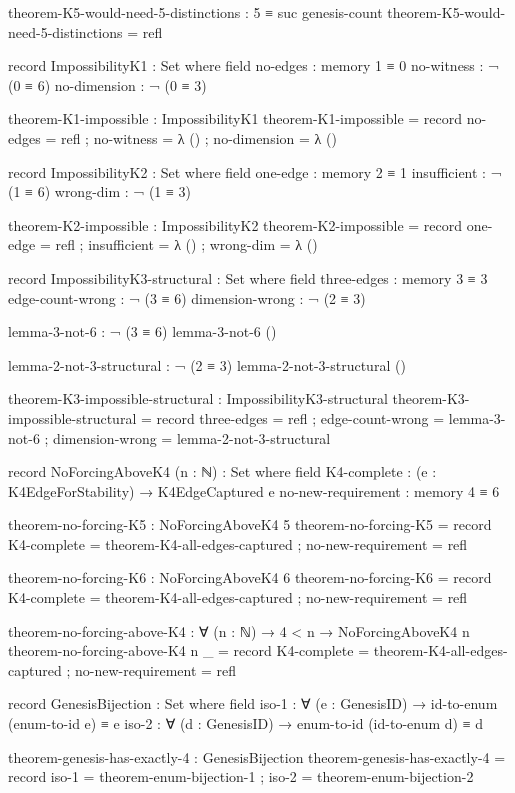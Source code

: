 \documentclass[11pt,a4paper]{book}
\begin{document}
\begin{code}
theorem-K5-would-need-5-distinctions : 5 ≡ suc genesis-count
theorem-K5-would-need-5-distinctions = refl

record ImpossibilityK1 : Set where
  field
    no-edges      : memory 1 ≡ 0
    no-witness    : ¬ (0 ≡ 6)
    no-dimension  : ¬ (0 ≡ 3)

theorem-K1-impossible : ImpossibilityK1
theorem-K1-impossible = record
  { no-edges     = refl
  ; no-witness   = λ ()
  ; no-dimension = λ ()
  }

record ImpossibilityK2 : Set where
  field
    one-edge      : memory 2 ≡ 1
    insufficient  : ¬ (1 ≡ 6)
    wrong-dim     : ¬ (1 ≡ 3)

theorem-K2-impossible : ImpossibilityK2
theorem-K2-impossible = record
  { one-edge     = refl
  ; insufficient = λ ()
  ; wrong-dim    = λ ()
  }

record ImpossibilityK3-structural : Set where
  field
    three-edges     : memory 3 ≡ 3
    edge-count-wrong : ¬ (3 ≡ 6)
    dimension-wrong  : ¬ (2 ≡ 3)

lemma-3-not-6 : ¬ (3 ≡ 6)
lemma-3-not-6 ()

lemma-2-not-3-structural : ¬ (2 ≡ 3)
lemma-2-not-3-structural ()

theorem-K3-impossible-structural : ImpossibilityK3-structural
theorem-K3-impossible-structural = record
  { three-edges      = refl
  ; edge-count-wrong = lemma-3-not-6
  ; dimension-wrong  = lemma-2-not-3-structural
  }

record NoForcingAboveK4 (n : ℕ) : Set where
  field
    K4-complete        : (e : K4EdgeForStability) → K4EdgeCaptured e
    no-new-requirement : memory 4 ≡ 6

theorem-no-forcing-K5 : NoForcingAboveK4 5
theorem-no-forcing-K5 = record
  { K4-complete        = theorem-K4-all-edges-captured
  ; no-new-requirement = refl
  }

theorem-no-forcing-K6 : NoForcingAboveK4 6
theorem-no-forcing-K6 = record
  { K4-complete        = theorem-K4-all-edges-captured
  ; no-new-requirement = refl
  }

theorem-no-forcing-above-K4 : ∀ (n : ℕ) → 4 < n → NoForcingAboveK4 n
theorem-no-forcing-above-K4 n _ = record
  { K4-complete = theorem-K4-all-edges-captured
  ; no-new-requirement = refl
  }

record GenesisBijection : Set where
  field
    iso-1 : ∀ (e : GenesisID) → id-to-enum (enum-to-id e) ≡ e
    iso-2 : ∀ (d : GenesisID) → enum-to-id (id-to-enum d) ≡ d

theorem-genesis-has-exactly-4 : GenesisBijection
theorem-genesis-has-exactly-4 = record
  { iso-1 = theorem-enum-bijection-1
  ; iso-2 = theorem-enum-bijection-2
  }


\end{code}
\end{document}

